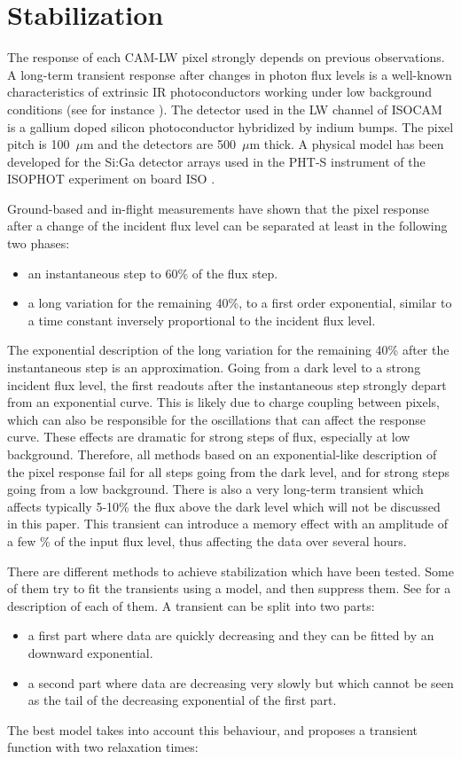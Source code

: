 \section{Stabilization}
The response of each CAM-LW pixel strongly depends on previous observations. 
A long-term transient response after changes in
photon flux levels is a well-known characteristics of extrinsic IR
photoconductors working under low background conditions (see for
instance \cite{iso:fouks95}).  The detector used in the LW channel
of ISOCAM is a gallium doped silicon photoconductor hybridized by
indium bumps. The pixel pitch is 100~$\mu$m and the detectors are
500~$\mu$m thick. A physical model has been developed for the Si:Ga
detector arrays used in the PHT-S instrument of the ISOPHOT experiment
on board ISO \cite{iso:fouks95}.  

Ground-based and in-flight measurements have shown that the pixel response
after a change of the incident flux level can be separated at least in the 
following two phases:
\begin{itemize}
\item an instantaneous step to 60\% of the flux step.
\item a long variation for the remaining 40\%, to a first order exponential,
similar to a time constant inversely proportional to the incident flux level.
\end{itemize}
The exponential description of the long variation for the remaining
40\% after the instantaneous step is an approximation. Going from a
dark level to a strong incident flux level,
the first readouts after the instantaneous step strongly depart from
an exponential curve. This is likely due to charge coupling between
pixels, which can also be responsible for the oscillations that can
affect the response curve.  These effects are dramatic for strong
steps of flux, especially at low background.  Therefore, all methods
based on an exponential-like description of the pixel response fail
for all steps going from the dark level, and for strong steps going
from a low background. There is also a very long-term transient which
affects typically 5-10\% the flux above the dark level which will not
be discussed in this paper. This transient can introduce a memory
effect with an amplitude of a few \% of the input flux level, thus
affecting  the data over several hours.  


There are  different methods to achieve stabilization which have
been tested. 
Some of them try to fit the transients using a
model, and then suppress them. See \cite{iso:delattre96} for a description of each of them. A transient can be split into two parts:  
\begin{itemize}
\item a first part where data are quickly decreasing and they can 
be fitted by an downward exponential.
\item a second part where data are decreasing very slowly but which 
cannot be seen as the tail of the decreasing exponential of the first
part.
\end{itemize}
The best model takes into account this behaviour, and proposes a transient
function with two relaxation times:

